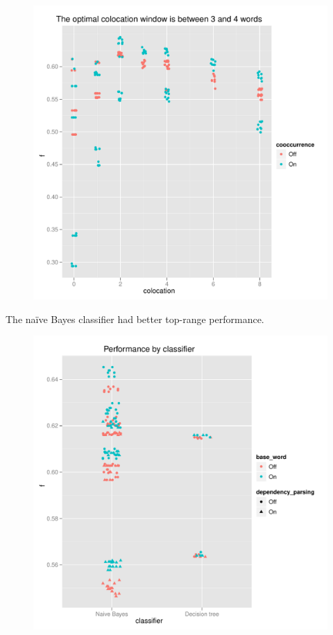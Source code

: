 \documentclass{article}
\newcommand{\naive}{na\"ive}
\begin{document}
\begin{figure}[H]
\includegraphics[width=\textwidth]{pg_0002}
\caption{\label{fig2}}
\end{figure}

The \naive{} Bayes classifier had better top-range performance.

\begin{figure}[H]
\includegraphics[width=\textwidth]{pg_0003}
\caption{\label{fig3}}
\end{figure}
\end{document}
